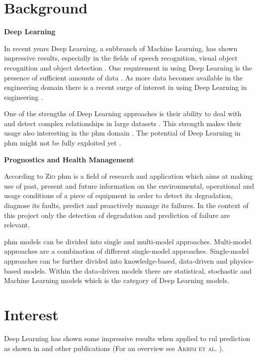 \documentclass[conference]{IEEEtran}
\begin{document}
\IEEEpeerreviewmaketitle

\section{Background}
\label{sec:background}

\noindent
\textbf{Deep Learning}

In recent years Deep Learning, a subbranch of Machine Learning, has shown impressive results, especially in the fields of speech recognition, visual object recognition and object detection \cite{LeCun2015}. One requirement in using Deep Learning is the presence of sufficient amounts of data \cite{Sikorska2011}. As more data becomes available in the engineering domain there is a recent surge of interest in using Deep Learning in engineering \cite{Voulodimos2018}.

One of the strengths of Deep Learning approaches is their ability to deal with and detect complex relationships in large datasets \cite{MONTEROJIMENEZ2020539}. This strength makes their usage also interesting in the \gls{phm} domain \cite{Wu2015}. The potential of Deep Learning in \gls{phm} might not be fully exploited yet \cite{Akrim2021}.

\noindent
\textbf{Prognostics and Health Management}

According to \textsc{Zio} \cite{Zio2012} \gls{phm} is a field of research and application which aims at making use of past, present and future information on the environmental, operational and usage conditions of a piece of equipment in order to detect its degradation, diagnose its faults, predict and proactively manage its failures. In the context of this project only the detection of degradation and prediction of failure are relevant.

\gls{phm} models can be divided into single and multi-model approaches. Multi-model approaches are a combination of different single-model approaches. Single-model approaches can be further divided into knowledge-based, data-driven and physics-based models. Within the data-driven models there are statistical, stochastic and Machine Learning models which is the category of Deep Learning models. \cite{MONTEROJIMENEZ2020539}

\section{Interest}
\label{sec:interest}

Deep Learning has shown some impressive results when applied to \gls{rul} prediction as shown in \cite{Xu2018, Li2018, Liu2019, Yuan2016, Wu2018, Park2020} and other publications (For an overview see \textsc{Akrim et al.} \cite{Akrim2021}).
\end{document}

